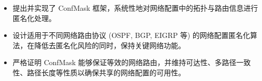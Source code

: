 


\begin{itemize}[nosep]
  \item 提出并实现了 ConfMask 框架，系统性地对网络配置中的拓扑与路由信息进行匿名化处理。
  \item 设计适用于不同网络路由协议 (OSPF, BGP, EIGRP 等) 的网络配置匿名化算法，在降低去匿名化风险的同时，保持关键网络功能。
  \item 严格证明 ConfMask 能够保证等效的网络路由，并维持可达性、多路径一致性、路径长度等性质以确保共享的网络配置的可用性。
\end{itemize}
